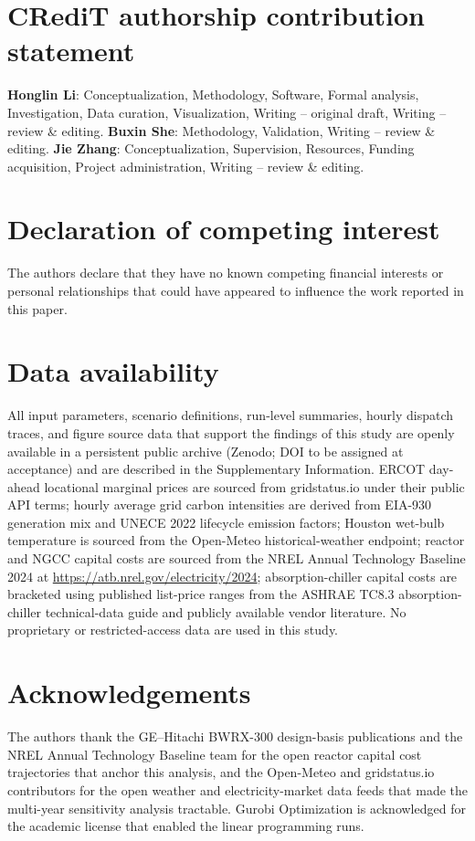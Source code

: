\documentclass[a4paper,fleqn]{cas-sc}
\begin{document}
\section*{CRediT authorship contribution statement}
\textbf{Honglin Li}: Conceptualization, Methodology, Software, Formal analysis, Investigation, Data curation, Visualization, Writing -- original draft, Writing -- review \& editing. \textbf{Buxin She}: Methodology, Validation, Writing -- review \& editing. \textbf{Jie Zhang}: Conceptualization, Supervision, Resources, Funding acquisition, Project administration, Writing -- review \& editing.


\section*{Declaration of competing interest}
The authors declare that they have no known competing financial interests or personal relationships that could have appeared to influence the work reported in this paper.


\section*{Data availability}
All input parameters, scenario definitions, run-level summaries, hourly dispatch traces, and figure source data that support the findings of this study are openly available in a persistent public archive (Zenodo; DOI to be assigned at acceptance) and are described in the Supplementary Information. ERCOT day-ahead locational marginal prices are sourced from gridstatus.io under their public API terms; hourly average grid carbon intensities are derived from EIA-930 generation mix and UNECE 2022 lifecycle emission factors; Houston wet-bulb temperature is sourced from the Open-Meteo historical-weather endpoint; reactor and NGCC capital costs are sourced from the NREL Annual Technology Baseline 2024 at \url{https://atb.nrel.gov/electricity/2024}; absorption-chiller capital costs are bracketed using published list-price ranges from the ASHRAE TC8.3 absorption-chiller technical-data guide and publicly available vendor literature. No proprietary or restricted-access data are used in this study.


\section*{Acknowledgements}
The authors thank the GE--Hitachi BWRX-300 design-basis publications and the NREL Annual Technology Baseline team for the open reactor capital cost trajectories that anchor this analysis, and the Open-Meteo and gridstatus.io contributors for the open weather and electricity-market data feeds that made the multi-year sensitivity analysis tractable. Gurobi Optimization is acknowledged for the academic license that enabled the linear programming runs.




\end{document}
